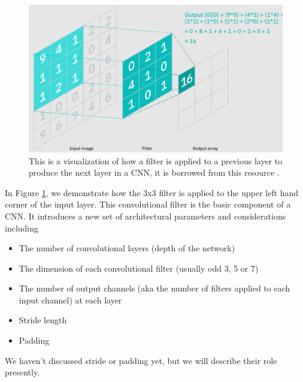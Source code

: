 \documentclass[11pt]{amsart}
\begin{document}
\begin{figure}[h]
	\centering
	\includegraphics[width=.6\textwidth]{../visualizations/convolution_visualization.png}
\caption{This is a visualization of how a filter is applied to a previous layer to produce the next layer in a CNN, it is borrowed from this resource \cite{vitalfluxRealWorldApplications}.}
    \label{fig:conv_viz}
\end{figure}

In Figure \ref{fig:conv_viz}, we demonstrate how the 3x3 filter is applied to the upper left hand corner of the input layer.
This convolutional filter is the basic component of a CNN.
It introduces a new set of architectural parameters and considerations including
\begin{itemize}
\item The number of convolutional layers (depth of the network)
\item The dimension of each convolutional filter (usually odd 3, 5 or 7)
\item The number of output channels (aka the number of filters applied to each input channel) at each layer
\item Stride length
\item Padding
\end{itemize}
We haven't discussed stride or padding yet, but we will describe their role presently.
\end{document}
